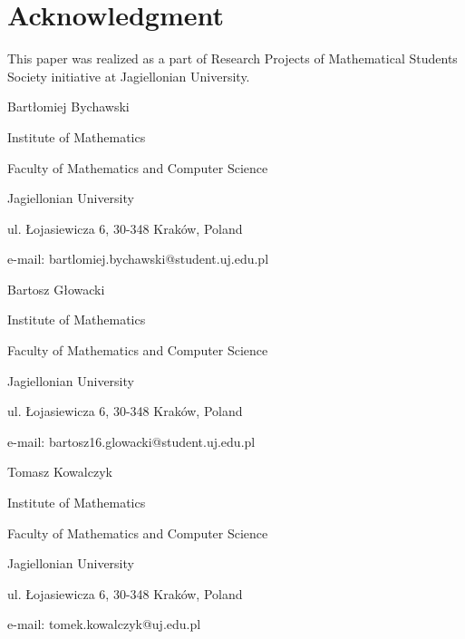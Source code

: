 \documentclass[12pt,reqno]{amsart}   	%
\theoremstyle{remark}
\begin{document}
\section*{Acknowledgment}
This paper was realized as a part of Research Projects of Mathematical Students Society initiative at Jagiellonian University.






\begin{small}

\vspace{5pt}

\noindent
Bartłomiej Bychawski

\noindent
Institute of Mathematics

\noindent
Faculty of Mathematics and Computer Science

\noindent
Jagiellonian University

\noindent
ul. Łojasiewicza 6, 30-348 Kraków, Poland

\noindent
e-mail: bartlomiej.bychawski@student.uj.edu.pl


\vspace{5pt}

\noindent
Bartosz Głowacki

\noindent
Institute of Mathematics

\noindent
Faculty of Mathematics and Computer Science

\noindent
Jagiellonian University

\noindent
ul. Łojasiewicza 6, 30-348 Kraków, Poland

\noindent
e-mail: bartosz16.glowacki@student.uj.edu.pl


\vspace{5pt}

\noindent
Tomasz Kowalczyk

\noindent
Institute of Mathematics

\noindent
Faculty of Mathematics and Computer Science

\noindent
Jagiellonian University

\noindent
ul. Łojasiewicza 6, 30-348 Kraków, Poland

\noindent
e-mail: tomek.kowalczyk@uj.edu.pl



\end{small}	
\end{document}
